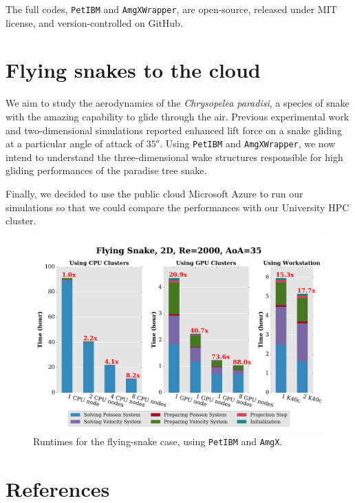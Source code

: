 \documentclass[review]{elsarticle}
\begin{document}
The full codes, \texttt{PetIBM} and \texttt{AmgXWrapper}, are open-source, released under MIT license, and version-controlled on GitHub.


\section{Flying snakes to the cloud}

We aim to study the aerodynamics of the \textit{Chrysopelea paradisi}, a species of snake with the amazing capability to glide through the air.
Previous experimental work \cite{Holden_et_al_2014} and two-dimensional simulations \cite{Krishnan_et_al_2014} reported enhanced lift force on a snake gliding at a particular angle of attack of $35^o$.
Using \texttt{PetIBM} and \texttt{AmgXWrapper}, we now intend to understand the three-dimensional wake structures responsible for high gliding performances of the paradise tree snake.

Finally, we decided to use the public cloud Microsoft Azure to run our simulations so that we could compare the performances with our University HPC cluster.


\begin{figure}[h!]
\centering
\includegraphics[width=12cm]{images/flying_snake_performances.png}
\caption{Runtimes for the flying-snake case, using \texttt{PetIBM} and \texttt{AmgX}.}
\label{flying_snake_performances}
\end{figure}

\section*{References}


\end{document}
